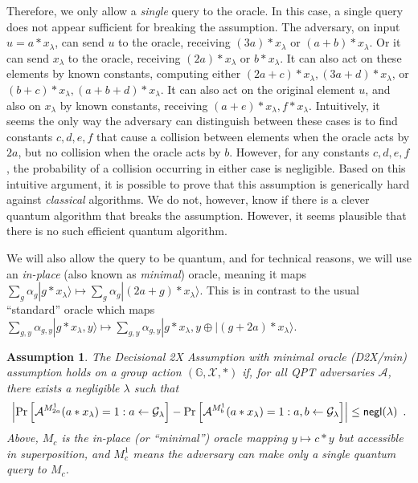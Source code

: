\documentclass{article}\usepackage[a4paper,margin=20mm]{geometry}
\newtheorem{assumption}[theorem]{Assumption}
\numberwithin{theorem}{section}
\numberwithin{equation}{section}
\newcommand{\G}{\mathbb{G}}
\newcommand{\As}{{\mathcal{A}}}
\newcommand{\Gs}{{\mathcal{G}}}
\newcommand{\Xs}{{\mathcal{X}}}
\newcommand{\negl}{{\sf negl}}
\begin{document}
Therefore, we only allow a \emph{single} query to the oracle. In this case, a single query does not appear sufficient for breaking the assumption. The adversary, on input $u=a*x_\lambda$, can send $u$ to the oracle, receiving $(3a)*x_\lambda$ or $(a+b)*x_\lambda$. Or it can send $x_\lambda$ to the oracle, receiving $(2a)*x_\lambda$ or $b*x_\lambda$. It can also act on these elements by known constants, computing either $(2a+c)*x_\lambda,(3a+d)*x_\lambda$, or $(b+c)*x_\lambda,(a+b+d)*x_\lambda$. It can also act on the original element $u$, and also on $x_\lambda$ by known constants, receiving $(a+e)*x_\lambda,f*x_\lambda$. Intuitively, it seems the only way the adversary can distinguish between these cases is to find constants $c,d,e,f$ that cause a collision between elements when the oracle acts by $2a$, but no collision when the oracle acts by $b$. However, for any constants $c,d,e,f$, the probability of a collision occurring in either case is negligible. Based on this intuitive argument, it is possible to prove that this assumption is generically hard against \emph{classical} algorithms. We do not, however, know if there is a clever quantum algorithm that breaks the assumption. However, it seems plausible that there is no such efficient quantum algorithm.

We will also allow the query to be quantum, and for technical reasons, we will use an \emph{in-place} (also known as \emph{minimal}) oracle, meaning it maps $\sum_g\alpha_g|g*x_\lambda\rangle\mapsto \sum_g\alpha_g|(2a+g)*x_\lambda\rangle$. This is in contrast to the usual ``standard'' oracle which maps $\sum_{g,y}\alpha_{g,y}|g*x_\lambda,y\rangle\mapsto \sum_{g,y}\alpha_{g,y}|g*x_\lambda,y\oplus |(g+2a)*x_\lambda\rangle$.

\begin{assumption}\label{def:D2X/min} The Decisional 2X Assumption with minimal oracle (D2X/min) assumption holds on a group action $(\G,\Xs,*)$ if, for all QPT adversaries $\As$, there exists a negligible $\lambda$ such that 
	\[\left|\Pr\left[\As^{M_{2a}^1}(a*x_\lambda)=1: a\gets\Gs_\lambda\right]-\Pr\left[\As^{M_b^1}(a*x_\lambda)=1: a,b\gets\Gs_\lambda\right]\right|\leq\negl(\lambda)\enspace .\]
	Above, $M_{c}$ is the in-place (or ``minimal'') oracle mapping $y\mapsto c*y$ but accessible in superposition, and $M_{c}^1$ means the adversary can make only a single quantum query to $M_c$.
\end{assumption}
\end{document}
